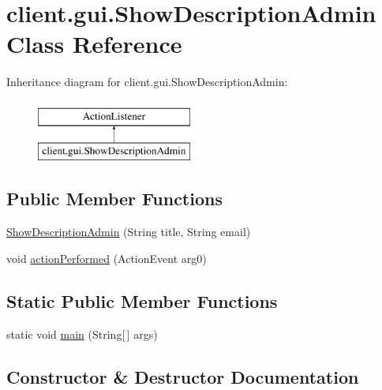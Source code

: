 \hypertarget{classclient_1_1gui_1_1_show_description_admin}{}\section{client.\+gui.\+Show\+Description\+Admin Class Reference}
\label{classclient_1_1gui_1_1_show_description_admin}
Inheritance diagram for client.\+gui.\+Show\+Description\+Admin\+:\begin{figure}[H]
\begin{center}
\leavevmode
\includegraphics[height=2.000000cm]{classclient_1_1gui_1_1_show_description_admin}
\end{center}
\end{figure}
\subsection*{Public Member Functions}
\begin{DoxyCompactItemize}
\item 
\hyperlink{classclient_1_1gui_1_1_show_description_admin_a34a5512bb2b985ce2e0dee1d571daf67}{Show\+Description\+Admin} (String title, String email)
\item 
void \hyperlink{classclient_1_1gui_1_1_show_description_admin_ae39552f7efb7cc8078f736c63ee9c4e4}{action\+Performed} (Action\+Event arg0)
\end{DoxyCompactItemize}
\subsection*{Static Public Member Functions}
\begin{DoxyCompactItemize}
\item 
static void \hyperlink{classclient_1_1gui_1_1_show_description_admin_a1309c0192e30d9545a20f7dd1a05af2a}{main} (String\mbox{[}$\,$\mbox{]} args)
\end{DoxyCompactItemize}


\subsection{Constructor \& Destructor Documentation}
\mbox{\label{classclient_1_1gui_1_1_show_description_admin_a34a5512bb2b985ce2e0dee1d571daf67}} 
